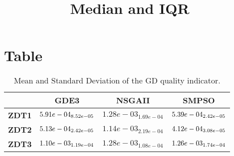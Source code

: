 \documentclass{article}
\title{Median and IQR}
\author{}
\begin{document}
\maketitle
\section{Table}
\begin{table}[!htp]
  \caption{Mean and Standard Deviation of the GD quality indicator.}
  \label{table:GD}
  \centering
  \begin{scriptsize}
  \begin{tabular}{c|ccc}
      & \textbf{GDE3} & \textbf{NSGAII} & \textbf{SMPSO} \\\hline
      \textbf{ZDT1} & $\cellcolor{gray25} 5.91e-04_{8.52e-05} $ & $ 1.28e-03_{1.69e-04} $ & $ \cellcolor{gray95} 5.39e-04_{2.42e-05}$ \\
      \textbf{ZDT2} & $\cellcolor{gray25} 5.13e-04_{2.42e-05} $ & $ 1.14e-03_{2.19e-04} $ & $ \cellcolor{gray95} 4.12e-04_{3.08e-05}$ \\
      \textbf{ZDT3} & $\cellcolor{gray95} 1.10e-03_{1.19e-04} $ & $ 1.28e-03_{1.08e-04} $ & $ \cellcolor{gray25} 1.26e-03_{1.74e-04}$ \\
  \end{tabular}
  \end{scriptsize}
\end{table}
\end{document}
